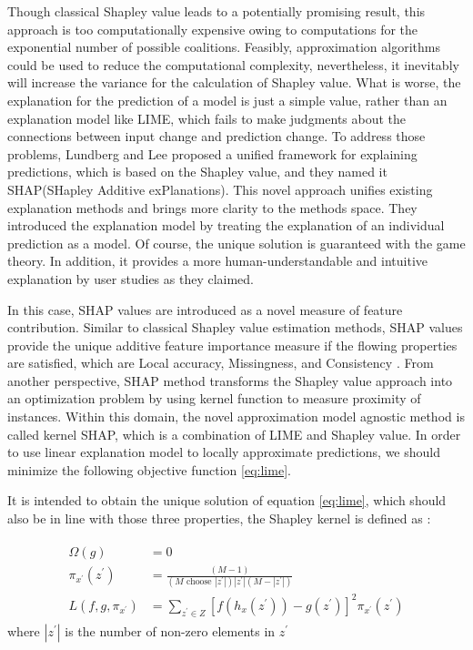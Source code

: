 Though classical Shapley value leads to a potentially promising result, this approach is too computationally expensive owing to computations for the exponential number of possible coalitions. Feasibly, approximation algorithms could be used to reduce the computational complexity, nevertheless, it inevitably will increase the variance for the calculation of Shapley value. What is worse, the explanation for the prediction of a model is just a simple value, rather than an explanation model like LIME, which fails to make judgments about the connections between input change and prediction change. To address those problems, Lundberg and Lee \cite{lundberg2017unified} proposed a unified framework for explaining predictions, which is based on the Shapley value, and they named it SHAP(SHapley Additive exPlanations). This novel approach unifies existing explanation methods and brings more clarity to the methods space. They introduced the explanation model by treating the explanation of an individual prediction as a model. Of course, the unique solution is guaranteed with the game theory. In addition, it provides a more human-understandable and intuitive explanation by user studies as they claimed. 

In this case, SHAP values are introduced as a novel measure of feature contribution. Similar to classical Shapley value estimation methods, SHAP values provide the unique additive feature importance measure if the flowing properties are satisfied, which are Local accuracy, Missingness, and Consistency \cite{lundberg2017unified}. From another perspective, SHAP method transforms the Shapley value approach into an optimization problem by using kernel function to measure proximity of instances. Within this domain, the novel approximation model agnostic method is called kernel SHAP, which is a combination of LIME and Shapley value. In order to use linear explanation model to locally approximate predictions, we should minimize the following objective function \ref{eq:lime}. 

It is intended to obtain the unique solution of equation \ref{eq:lime}, which should also be in line with those three properties, the Shapley kernel is defined as \cite{lundberg2017unified}:

\begin{equation} \label{eq:shap_kernel}
\begin{gathered}
\begin{aligned} \Omega(g) &=0 \\ \pi_{x^{\prime}}\left(z^{\prime}\right) &=\frac{(M-1)}{\left(M \text { choose }\left|z^{\prime}\right|\right)\left|z^{\prime}\right|\left(M-\left|z^{\prime}\right|\right)} \\ L\left(f, g, \pi_{x^{\prime}}\right) &=\sum_{z^{\prime} \in Z}\left[f\left(h_{x}\left(z^{\prime}\right)\right)-g\left(z^{\prime}\right)\right]^{2} \pi_{x^{\prime}}\left(z^{\prime}\right) \end{aligned}
\end{gathered}
\end{equation}
where $|z^\prime|$ is the number of non-zero elements in $z^\prime$

